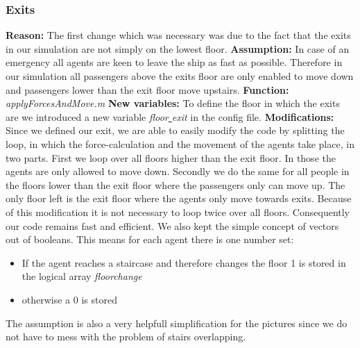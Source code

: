 \documentclass[11pt]{article}
\begin{document}
\subsubsection{Exits}
\textbf{Reason:}
\newline
The first change which was necessary was due to the fact that the exits in our simulation are not simply on the lowest floor.
\newline
\textbf{Assumption:}
\newline
In case of an emergency all agents are keen to leave the ship as fast as possible. Therefore in our simulation all passengers above the exits floor are only enabled to move down and passengers lower than the exit floor move upstairs.
\newline
\textbf{Function:}
\newline
\textit{applyForcesAndMove.m}
\newline
\textbf{New variables:}
\newline 
To define the floor in which the exits are we introduced a new variable \textit{floor\underline{ }exit} in the config file.
\newline
\textbf{Modifications:}
\newline
Since we defined our exit, we are able to easily modify the code by splitting the loop, in which the force-calculation and the movement of the agents take place, in two parts. First we loop over all floors higher than the exit floor. In those the agents are only allowed to move down. Secondly we do the same for all people in the floors lower than the exit floor where the passengers only can move up. The only floor left is the exit floor where the agents only move towards exits.
\newline
Because of this modification it is not necessary to loop twice over all floors. Consequently our code remains fast and efficient. We also kept the simple concept of vectors out of booleans. This means for each agent there is one number set: 
\begin{itemize}
\item If the agent reaches a staircase and therefore changes the floor 1 is stored in the logical array \textit{floorchange}
\item otherwise a 0 is stored
\end{itemize}
The assumption is also a very helpfull simplification for the pictures since we do not have to mess with the problem of stairs overlapping.
\end{document}

